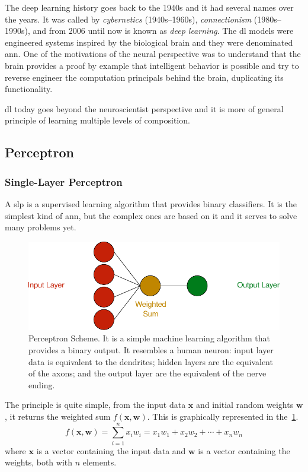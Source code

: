 The deep learning history goes back to the 1940s and it had several names over the years. It was called by \emph{cybernetics} (1940s--1960s), \emph{connectionism} (1980s--1990s), and from 2006 until now is known as \emph{deep learning}.
The \gls*{dl} models were engineered systems inspired by the biological brain and they were denominated \gls*{ann}.
One of the motivations of the neural perspective was to understand that the brain provides a proof by example that intelligent behavior is possible and try to reverse engineer the computation principals behind the brain, duplicating its functionality.

\gls*{dl} today goes beyond the neuroscientist perspective and it is more of general principle of learning multiple levels of composition.

\subsection{Perceptron}

\subsubsection*{Single-Layer Perceptron}

A \gls*{slp} is a supervised learning algorithm that provides binary classifiers. It is the simplest kind of \gls*{ann}, but the complex ones are based on it and it serves to solve many problems yet.

\begin{figure}[!htb]
    \centering
    \includegraphics{figures/2review/nn/perceptron.pdf}
    \caption[Perceptron Scheme]{Perceptron Scheme. It is a simple machine learning algorithm that provides a binary output. It resembles a human neuron: input layer data is equivalent to the dendrites; hidden layers are the equivalent of the axons; and the output layer are the equivalent of the nerve ending.}
    \label{fig:perceptron}
\end{figure}

The principle is quite simple, from the input data \(\mathbf{x}\) and initial random weights \(\mathbf{w}\), it returns the weighted sum \(f(\mathbf{x},\mathbf{w})\). This is graphically represented in the~\cref{fig:perceptron}.
%
\begin{equation}\label{eq:perceptron_weighted_sum}
    f(\mathbf{x},\mathbf{w}) = \sum_{i=1}^n x_iw_i =  x_1w_1 + x_2w_2 + \cdots + x_nw_n
\end{equation}
%
where \(\mathbf{x}\) is a vector containing the input data and \(\mathbf{w}\) is a vector containing the weights, both with \(n\) elements.

